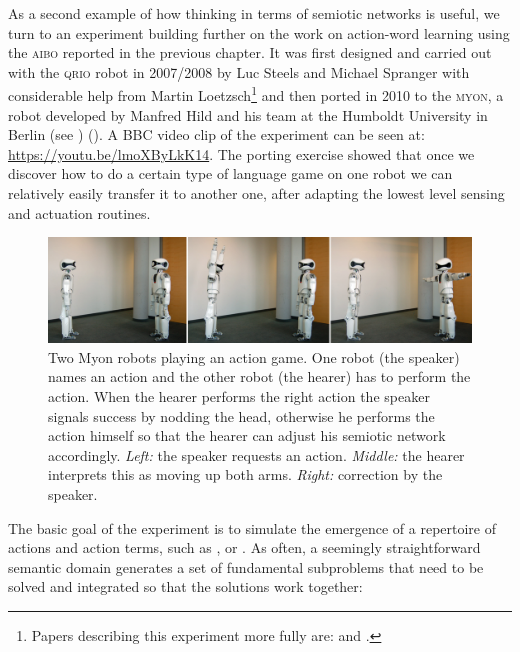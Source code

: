 As a second example of how thinking in terms of semiotic networks is useful,
we turn to an experiment building further on the work on action-word learning 
using the \textsc{aibo} reported in the previous chapter.
It was first designed and carried out with the \textsc{qrio} robot in 2007/2008 by Luc Steels and
Michael Spranger with considerable help from Martin Loetzsch\footnote{Papers describing this experiment more fully are: 
\cite{Steels:2008spatial} and \cite{Steels:2008b}.} and 
then ported in 2010 to the \textsc{myon}, a robot developed by Manfred Hild and his team at the Humboldt 
University in Berlin (see ) (\cite{Steels:2012b}). 
A BBC video clip of the experiment can be seen at: \url{https://youtu.be/lmoXByLkK14}.
The porting exercise showed that once we discover how to do a certain type of language game on one robot 
we can relatively easily transfer it to another one, after adapting the lowest level sensing and actuation routines. 

\begin{figure}[htbp]
  \centerline{\includegraphics[width=1.0\textwidth]{chap11/figs/myon-action-game.pdf}}
\caption{
Two Myon robots playing an action game. One robot (the speaker) names an action and the other robot (the hearer) 
has to perform the action. When the hearer performs the right action the speaker signals success by nodding the head, 
otherwise he performs the action himself so that the hearer can adjust his semiotic network accordingly. {\itshape Left:} the speaker
requests an action. {\itshape Middle:} the hearer interprets this as moving up both arms. {\itshape Right:} correction by the speaker. 
}\label{fig:myon-action} 
\end{figure}

The basic goal of the experiment is to simulate the emergence of a repertoire of actions and action terms, such as 
, or . As often, a seemingly straightforward semantic domain generates 
a set of fundamental subproblems that need to be solved and integrated so that the solutions work together: 

